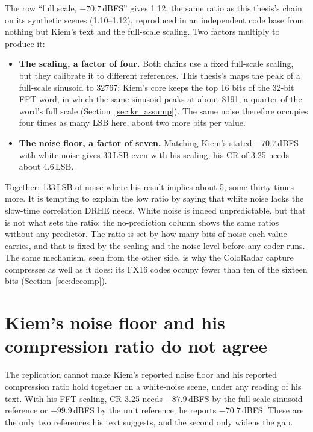 \noindent
The row ``full scale, $-70.7$\,dBFS'' gives \num{1.12}, the same ratio as
this thesis's chain on its synthetic scenes (\num{1.10}--\num{1.12}),
reproduced in an independent code base from nothing but Kiem's text and the
full-scale scaling. Two factors
multiply to produce it:

\begin{itemize}
\item \textbf{The scaling, a factor of four.} Both chains use a fixed
full-scale scaling, but they calibrate it to different references. This
thesis's maps the peak of a full-scale sinusoid to \num{32767}; Kiem's core
keeps the top 16 bits of the 32-bit FFT word, in which the same sinusoid peaks
at about \num{8191}, a quarter of the word's full scale
(Section~\ref{sec:kr_assump}). The same noise therefore occupies four times as
many LSB here, about two more bits per value.
\item \textbf{The noise floor, a factor of seven.} Matching Kiem's stated
$-70.7$\,dBFS with white noise gives 33\,LSB even with his scaling; his CR of
3.25 needs about 4.6\,LSB.
\end{itemize}

\noindent
Together: 133\,LSB of noise where his result implies about 5, some thirty times
more. It is tempting to explain the low ratio by saying that white noise lacks
the slow-time correlation DRHE needs. White noise is indeed unpredictable, but
that is not what sets the ratio: the no-prediction column shows the same ratios
without any predictor. The ratio is set by how many bits of noise each value
carries, and that is fixed by the scaling and the noise level before any coder
runs. The same mechanism, seen from the other side, is why the ColoRadar capture
compresses as well as it does: its FX16 codes occupy fewer than ten of the
sixteen bits (Section~\ref{sec:decomp}).

\section{Kiem's noise floor and his compression ratio do not agree}
\label{sec:kr_nfcr}

The replication cannot make Kiem's reported noise floor and his reported
compression ratio hold together on a white-noise scene, under any reading of
his text. With his FFT scaling, CR 3.25 needs $-87.9$\,dBFS by the
full-scale-sinusoid reference or $-99.9$\,dBFS by the unit reference; he
reports $-70.7$\,dBFS. These are the only two references his text suggests, and
the second only widens the gap.

